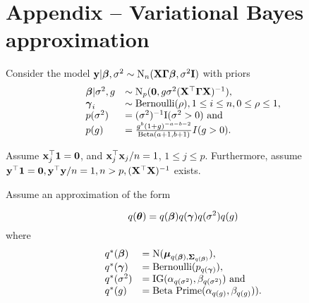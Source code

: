 \documentclass{amsart}[12pt]
\theoremstyle{definition}
\begin{document}

\section{Appendix -- Variational Bayes approximation}

Consider the model ${\bf y} | {\boldsymbol \beta}, \sigma^2 \sim \text{N}_n({\bf X} {\boldsymbol \Gamma} {\boldsymbol \beta}, \sigma^2 {\bf I})$ with
priors
\begin{equation*}
	\begin{array}{ll}
		{\boldsymbol\beta} | \sigma^2, g & \sim \text{N}_p({\bf 0}, g \sigma^2({\bf X}^\top {\boldsymbol\Gamma} {\bf X})^{-1}),        \\
		{\boldsymbol \gamma}_i            & \sim \text{Bernoulli}(\rho), 1 \leq i \leq n, 0 \leq \rho \leq 1,      \\
		p(\sigma^2)          & = (\sigma^2)^{-1} \text{I}(\sigma^2 > 0) \text{ and }                        \\
		p(g)                 & = \frac{g^b (1 + g)^{-a - b - 2}}{\text{Beta}(a + 1, b + 1)} I(g > 0). 
	\end{array}
\end{equation*}

Assume ${\bf x}_j^\top{\bf1} = {\bf 0}$, and ${\bf x}_j^\top {\bf x}_j / n = 1$, $1 \leq j \leq p$.
Furthermore, assume ${\bf y}^\top {\bf1} = {\bf 0}, {\bf y}^\top {\bf y} / n  = 1, n > p, ({\bf X}^\top {\bf X})^{-1}$ exists.

Assume an approximation of the form

\begin{equation*}
	q({\boldsymbol \theta}) = q({\boldsymbol \beta}) q({\boldsymbol \gamma}) q(\sigma^2) q(g)
\end{equation*}
where
\begin{equation*}
	\begin{array}{ll}
		q^*({\boldsymbol \beta})   & = \text{N}({\boldsymbol \mu}_{q({\boldsymbol \beta}), {\boldsymbol \Sigma}_{q({\boldsymbol \beta})}}),                  \\
		q^*({\boldsymbol \gamma})  & = \text{Bernoulli}(p_{q({\boldsymbol \gamma})}),                                 \\
		q^*(\sigma^2) & = \text{IG}(\alpha_{q(\sigma^2)}, \beta_{q(\sigma^2)}) \text{ and } \\
		q^*(g)        & = \text{Beta Prime}(\alpha_{q(g)}, \beta_{q(g)})).                  \\
	\end{array}
\end{equation*}
\end{document}
